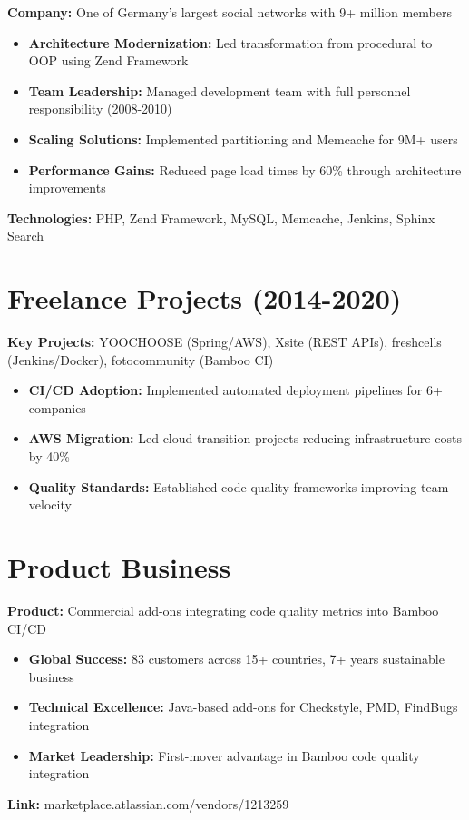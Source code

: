 \documentclass[11pt,a4paper,sans]{moderncv}
\begin{document}
{
\textbf{Company:} One of Germany's largest social networks with 9+ million members
\begin{itemize}[noitemsep,topsep=5pt]
\item \textbf{Architecture Modernization:} Led transformation from procedural to OOP using Zend Framework
\item \textbf{Team Leadership:} Managed development team with full personnel responsibility (2008-2010)
\item \textbf{Scaling Solutions:} Implemented partitioning and Memcache for 9M+ users
\item \textbf{Performance Gains:} Reduced page load times by 60\% through architecture improvements
\end{itemize}
\textbf{Technologies:} PHP, Zend Framework, MySQL, Memcache, Jenkins, Sphinx Search
}

\section{Freelance Projects (2014-2020)}

{
\textbf{Key Projects:} YOOCHOOSE (Spring/AWS), Xsite (REST APIs), freshcells (Jenkins/Docker), fotocommunity (Bamboo CI)
\begin{itemize}[noitemsep,topsep=5pt]
\item \textbf{CI/CD Adoption:} Implemented automated deployment pipelines for 6+ companies
\item \textbf{AWS Migration:} Led cloud transition projects reducing infrastructure costs by 40\%
\item \textbf{Quality Standards:} Established code quality frameworks improving team velocity
\end{itemize}
}

\section{Product Business}

{
\textbf{Product:} Commercial add-ons integrating code quality metrics into Bamboo CI/CD
\begin{itemize}[noitemsep,topsep=5pt]
\item \textbf{Global Success:} 83 customers across 15+ countries, 7+ years sustainable business
\item \textbf{Technical Excellence:} Java-based add-ons for Checkstyle, PMD, FindBugs integration
\item \textbf{Market Leadership:} First-mover advantage in Bamboo code quality integration
\end{itemize}
\textbf{Link:} marketplace.atlassian.com/vendors/1213259
}
\end{document}

